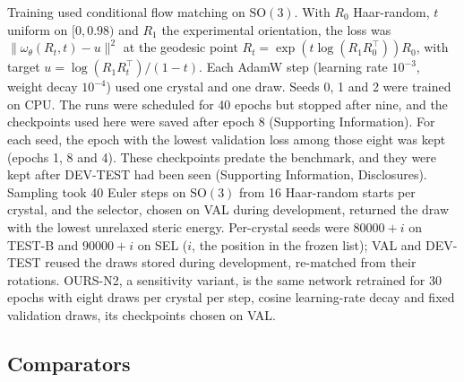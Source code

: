 Training used conditional flow matching on $\mathrm{SO}(3)$. With $R_0$
Haar-random, $t$ uniform on $[0,0.98)$ and $R_1$ the experimental orientation, the
loss was $\lVert\omega_\theta(R_t,t)-u\rVert^2$ at the geodesic point
$R_t=\exp(t\log(R_1R_0^{\top}))R_0$, with target $u=\log(R_1R_t^{\top})/(1-t)$.
Each AdamW step (learning rate $10^{-3}$, weight decay $10^{-4}$) used one crystal
and one draw. Seeds 0, 1 and 2 were trained on CPU. The runs were scheduled for 40
epochs but stopped after nine, and the checkpoints used here were saved after epoch 8
(Supporting Information). For each seed, the epoch with the lowest validation loss among
those eight was kept (epochs 1, 8 and 4). These checkpoints predate the benchmark, and
they were kept after DEV-TEST had been seen (Supporting Information, Disclosures).
Sampling took 40 Euler steps on $\mathrm{SO}(3)$ from 16 Haar-random starts per crystal,
and the selector, chosen on VAL during development, returned the draw with the lowest
unrelaxed steric energy. Per-crystal seeds were $80000+i$ on TEST-B and $90000+i$ on SEL
($i$, the position in the frozen list); VAL and DEV-TEST reused the draws stored during
development, re-matched from their rotations. OURS-N2, a sensitivity variant, is the same
network retrained for 30 epochs with eight draws per
crystal per step, cosine learning-rate decay and fixed validation draws, its
checkpoints chosen on VAL.

\subsection{Comparators}

